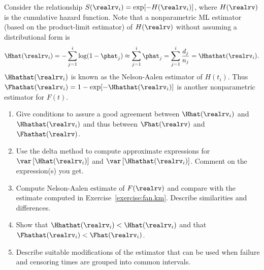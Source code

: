 \begin{exercise1}
\label{exercise:nelson.aalen.estimator}
Consider the relationship 
$S(\realrv_{i})=\exp[-H(\realrv_{i})]$, 
where $H(\realrv)$ is the cumulative hazard function. Note
that a nonparametric
ML estimator (based on the product-limit  estimator)
of $H(\realrv)$ without assuming a distributional form is 
\begin{displaymath}
    \Hhat(\realrv_{i}) = -\sum_{j=1}^{i}\log(1-\phat_{j}) 
	                          \approx \sum_{j=1}^{i}\phat_{j}
                                  =\sum_{j=1}^{i}\frac{d_{j}}{n_{j}}
=\Hhathat(\realrv_{i}).
\end{displaymath}
$\Hhathat(\realrv_{i})$ is known as the Nelson-Aalen
estimator of $H(t_{i})$. Thus $\Fhathat(\realrv_{i})=
1-\exp[-\Hhathat(\realrv_{i})]$ is another nonparametric
estimator for $F(t)$.
\begin{enumerate}
\item 
Give conditions to assure a good agreement between
$\Hhat(\realrv_{i})$ and $\Hhathat(\realrv_{i})$ and thus
between $\Fhat(\realrv)$ and $\Fhathat(\realrv)$.
\item 
Use the delta method to compute approximate expressions for  
$\var \left [\Hhat(\realrv_{i})\right ]$
and  $\var \left [\Hhathat(\realrv_{i})\right ]$.
Comment on the expression(s) you get. 	
\item
Compute Nelson-Aalen estimate of $F(\realrv)$ and compare with the
estimate computed in Exercise~\ref{exercise:fan.km}.  Describe
similarities and differences.  \item Show that
$\Hhathat(\realrv_{i})<\Hhat(\realrv_{i})$ and that
$\Fhathat(\realrv_{i}) <
\Fhat(\realrv_{i})$. 
\item
Describe suitable modifications of the estimator that can be used when
failure and censoring times are grouped into common intervals.
\end{enumerate} 
\end{exercise1}


